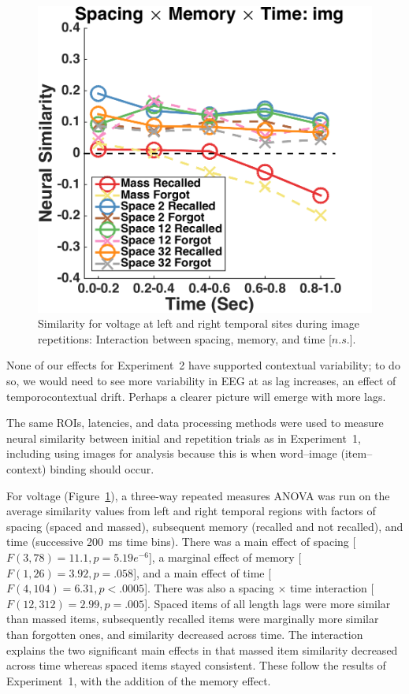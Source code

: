 \begin{figure}[H]
  \centering
  \includegraphics[width=.40\textwidth]{./figs/exp2/similarity_spacXmemXtime_img_tla_LTRT_0to200_200to400_400to600_600to800_800to1000_kaiser_cosine}
  \caption{Similarity for voltage at left and right temporal sites during image repetitions: Interaction between spacing, memory, and time [$n.s.$].}
  \label{fig:s2_sim_tla_spacXmemXtime}
\end{figure}


None of our effects for Experiment~2 have supported contextual variability; to do so, we would need to see more variability in EEG at as lag increases, an effect of temporocontextual drift.
Perhaps a clearer picture will emerge with more lags.


The same ROIs, latencies, and data processing methods were used to measure neural similarity between initial and repetition trials as in Experiment~1, including using images for analysis because this is when word--image (item--context) binding should occur.
 

For voltage (Figure~\ref{fig:s2_sim_tla_spacXmemXtime}), a three-way repeated measures ANOVA was run on the average similarity values from left and right temporal regions with factors of spacing (spaced and massed), subsequent memory (recalled and not recalled), and time (successive 200~ms time bins).  There was a main effect of spacing [$F(3,78)=11.1, p=5.19e^{-6}$], a marginal effect of memory [$F(1,26)=3.92, p=.058$], and a main effect of time [$F(4,104)=6.31, p<.0005$].  There was also a spacing $\times$ time interaction [$F(12,312)=2.99, p=.005$].  Spaced items of all length lags were more similar than massed items, subsequently recalled items were marginally more similar than forgotten ones, and similarity decreased across time.  The interaction explains the two significant main effects in that massed item similarity decreased across time whereas spaced items stayed consistent.  These follow the results of Experiment~1, with the addition of the memory effect.

